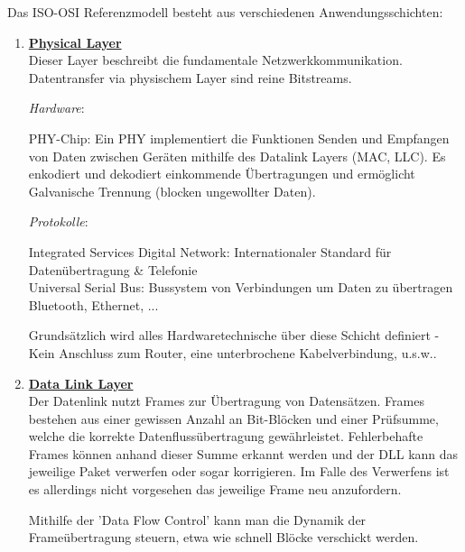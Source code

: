 \documentclass[11pt]{article}
\begin{document}
    Das ISO-OSI Referenzmodell besteht aus verschiedenen Anwendungsschichten:
    \begin{enumerate}
        \item \textbf{\underline{Physical Layer}}\\
        Dieser Layer beschreibt die fundamentale Netzwerkkommunikation. Datentransfer via
        physischem Layer sind reine Bitstreams.

        \emph{Hardware}:
        \begin{addmargin}[1em]{1em}
            PHY-Chip: Ein PHY implementiert die Funktionen Senden und Empfangen von Daten zwischen
            Geräten mithilfe des Datalink Layers (MAC, LLC). Es enkodiert und dekodiert einkommende
            Übertragungen und  ermöglicht Galvanische Trennung (blocken ungewollter Daten).
        \end{addmargin}

        \emph{Protokolle}:
        \begin{addmargin}[1em]{1em}
            Integrated Services Digital Network: Internationaler Standard für Datenübertragung \& Telefonie\\
            Universal Serial Bus: Bussystem von Verbindungen um Daten zu übertragen\\
            Bluetooth, Ethernet, ...
        \end{addmargin}

        Grundsätzlich wird alles Hardwaretechnische über diese Schicht definiert - Kein Anschluss zum Router,
        eine unterbrochene Kabelverbindung, u.s.w..

        \item \textbf{\underline{Data Link Layer}}\\
        Der Datenlink nutzt Frames zur Übertragung von Datensätzen. Frames bestehen aus einer gewissen Anzahl
        an Bit-Blöcken und einer Prüfsumme, welche die korrekte Datenflussübertragung gewährleistet.
        Fehlerbehafte Frames können anhand dieser Summe erkannt werden und der DLL kann das jeweilige Paket verwerfen
        oder sogar korrigieren.
        Im Falle des Verwerfens ist es allerdings nicht vorgesehen das jeweilige Frame neu anzufordern.

        Mithilfe der 'Data Flow Control' kann man die Dynamik der Frameübertragung steuern, etwa wie schnell
        Blöcke verschickt werden.


\end{enumerate}
\end{document}
